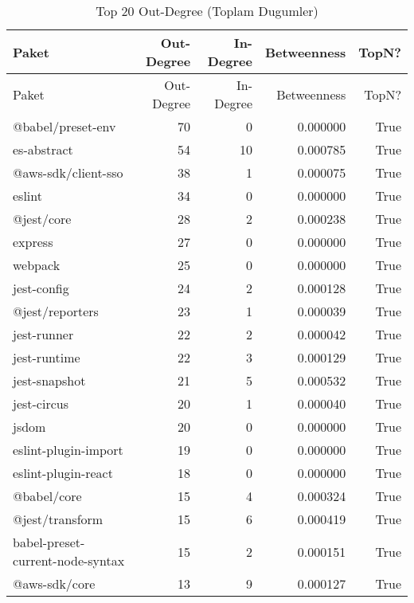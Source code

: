 \begin{longtable}{lrrrr}
\caption{Top 20 Out-Degree (Toplam Dugumler)}\\
\toprule
Paket & Out-Degree & In-Degree & Betweenness & TopN? \\
\midrule
\endfirsthead
\toprule
Paket & Out-Degree & In-Degree & Betweenness & TopN? \\
\midrule
\endhead
\bottomrule
\endfoot
\bottomrule
\endlastfoot
@babel/preset-env & 70 & 0 & 0.000000 & True \\
es-abstract & 54 & 10 & 0.000785 & True \\
@aws-sdk/client-sso & 38 & 1 & 0.000075 & True \\
eslint & 34 & 0 & 0.000000 & True \\
@jest/core & 28 & 2 & 0.000238 & True \\
express & 27 & 0 & 0.000000 & True \\
webpack & 25 & 0 & 0.000000 & True \\
jest-config & 24 & 2 & 0.000128 & True \\
@jest/reporters & 23 & 1 & 0.000039 & True \\
jest-runner & 22 & 2 & 0.000042 & True \\
jest-runtime & 22 & 3 & 0.000129 & True \\
jest-snapshot & 21 & 5 & 0.000532 & True \\
jest-circus & 20 & 1 & 0.000040 & True \\
jsdom & 20 & 0 & 0.000000 & True \\
eslint-plugin-import & 19 & 0 & 0.000000 & True \\
eslint-plugin-react & 18 & 0 & 0.000000 & True \\
@babel/core & 15 & 4 & 0.000324 & True \\
@jest/transform & 15 & 6 & 0.000419 & True \\
babel-preset-current-node-syntax & 15 & 2 & 0.000151 & True \\
@aws-sdk/core & 13 & 9 & 0.000127 & True \\
\end{longtable}
